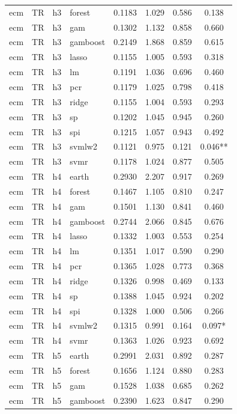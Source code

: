 \begin{ThreePartTable}
\begin{longtable}[t]{llclcccc}
ecm & TR & h3 & forest & 0.1183 & 1.029 & 0.586 & 0.138\\
ecm & TR & h3 & gam & 0.1302 & 1.132 & 0.858 & 0.660\\
ecm & TR & h3 & gamboost & 0.2149 & 1.868 & 0.859 & 0.615\\
ecm & TR & h3 & lasso & 0.1155 & 1.005 & 0.593 & 0.318\\
ecm & TR & h3 & lm & 0.1191 & 1.036 & 0.696 & 0.460\\
ecm & TR & h3 & pcr & 0.1179 & 1.025 & 0.798 & 0.418\\
ecm & TR & h3 & ridge & 0.1155 & 1.004 & 0.593 & 0.293\\
ecm & TR & h3 & sp & 0.1202 & 1.045 & 0.945 & 0.260\\
ecm & TR & h3 & spi & 0.1215 & 1.057 & 0.943 & 0.492\\
ecm & TR & h3 & svmlw2 & 0.1121 & 0.975 & 0.121 & 0.046**\\
ecm & TR & h3 & svmr & 0.1178 & 1.024 & 0.877 & 0.505\\
\addlinespace
ecm & TR & h4 & earth & 0.2930 & 2.207 & 0.917 & 0.269\\
ecm & TR & h4 & forest & 0.1467 & 1.105 & 0.810 & 0.247\\
ecm & TR & h4 & gam & 0.1501 & 1.130 & 0.841 & 0.460\\
ecm & TR & h4 & gamboost & 0.2744 & 2.066 & 0.845 & 0.676\\
ecm & TR & h4 & lasso & 0.1332 & 1.003 & 0.553 & 0.254\\
ecm & TR & h4 & lm & 0.1351 & 1.017 & 0.590 & 0.290\\
ecm & TR & h4 & pcr & 0.1365 & 1.028 & 0.773 & 0.368\\
ecm & TR & h4 & ridge & 0.1326 & 0.998 & 0.469 & 0.133\\
ecm & TR & h4 & sp & 0.1388 & 1.045 & 0.924 & 0.202\\
ecm & TR & h4 & spi & 0.1328 & 1.000 & 0.506 & 0.266\\
ecm & TR & h4 & svmlw2 & 0.1315 & 0.991 & 0.164 & 0.097*\\
ecm & TR & h4 & svmr & 0.1363 & 1.026 & 0.923 & 0.692\\
\addlinespace
ecm & TR & h5 & earth & 0.2991 & 2.031 & 0.892 & 0.287\\
ecm & TR & h5 & forest & 0.1656 & 1.124 & 0.880 & 0.283\\
ecm & TR & h5 & gam & 0.1528 & 1.038 & 0.685 & 0.262\\
ecm & TR & h5 & gamboost & 0.2390 & 1.623 & 0.847 & 0.290\\

\end{longtable}
\end{ThreePartTable}
